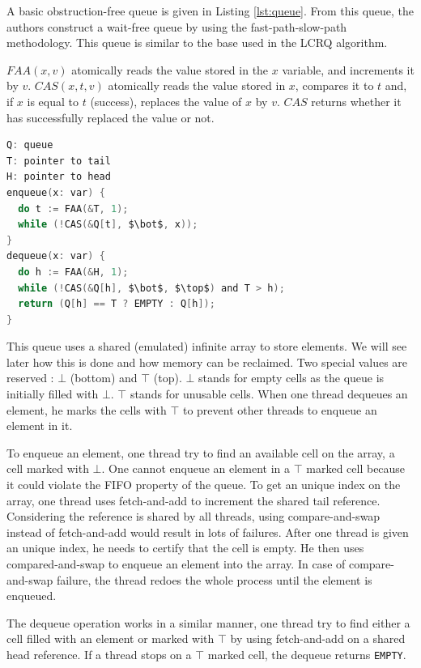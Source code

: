 A basic obstruction-free queue is given in Listing \ref{lst:queue}. From this
queue, the authors construct a wait-free queue by using the fast-path-slow-path
methodology. This queue is similar to the base used in the LCRQ algorithm.

$FAA(x, v)$ atomically reads the value stored in the $x$ variable, and
increments it by $v$. $CAS(x, t, v)$ atomically reads the value stored in $x$,
compares it to $t$ and, if $x$ is equal to $t$ (success), replaces the value of
$x$ by $v$. $CAS$ returns whether it has successfully replaced the value or not.

\begin{lstlisting}[mathescape,
                   frame=single,
                   caption={An obstruction-free queue using an infinite array.},
                   label={lst:queue},
                   language=C]
Q: queue
T: pointer to tail
H: pointer to head
enqueue(x: var) {
  do t := FAA(&T, 1);
  while (!CAS(&Q[t], $\bot$, x));
}
dequeue(x: var) {
  do h := FAA(&H, 1);
  while (!CAS(&Q[h], $\bot$, $\top$) and T > h);
  return (Q[h] == T ? EMPTY : Q[h]);
}
\end{lstlisting}

 This queue uses a shared (emulated) infinite array to
store elements. We will see later how this is done and how memory can be
reclaimed. Two special values are reserved : $\bot$ (bottom) and $\top$ (top).
$\bot$ stands for empty cells as the queue is initially filled with $\bot$.
$\top$ stands for unusable cells. When one thread dequeues an element, he marks
the cells with $\top$ to prevent other threads to enqueue an element in it.

To enqueue an element, one thread try to find an available cell on the array, a
cell marked with $\bot$. One cannot enqueue an element in a $\top$ marked cell
because it could violate the FIFO property of the queue. To get an unique index
on the array, one thread uses fetch-and-add to increment the shared tail
reference. Considering the reference is shared by all threads, using
compare-and-swap instead of fetch-and-add would result in lots of failures.
After one thread is given an unique index, he needs to certify that the cell is
empty. He then uses compared-and-swap to enqueue an element into the array. In
case of compare-and-swap failure, the thread redoes the whole process until the
element is enqueued.

The dequeue operation works in a similar manner, one thread try to find either a
cell filled with an element or marked with $\top$ by using fetch-and-add on a
shared head reference. If a thread stops on a $\top$ marked cell, the dequeue
returns \texttt{EMPTY}.

